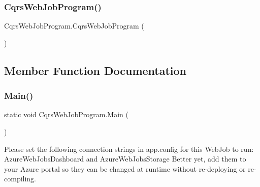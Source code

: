 \subsubsection{\texorpdfstring{Cqrs\+Web\+Job\+Program()}{CqrsWebJobProgram()}}
{\footnotesize\ttfamily Cqrs\+Web\+Job\+Program.\+Cqrs\+Web\+Job\+Program (\begin{DoxyParamCaption}{ }\end{DoxyParamCaption})}



\subsection{Member Function Documentation}
\mbox{\label{classCqrsWebJobProgram_ab11d66be0194de537cb7ae73e74c2181_ab11d66be0194de537cb7ae73e74c2181}} 
\subsubsection{\texorpdfstring{Main()}{Main()}}
{\footnotesize\ttfamily static void Cqrs\+Web\+Job\+Program.\+Main (\begin{DoxyParamCaption}{ }\end{DoxyParamCaption})\hspace{0.3cm}{\ttfamily [static]}}

Please set the following connection strings in app.\+config for this Web\+Job to run\+: Azure\+Web\+Jobs\+Dashboard and Azure\+Web\+Jobs\+Storage Better yet, add them to your Azure portal so they can be changed at runtime without re-\/deploying or re-\/compiling. 